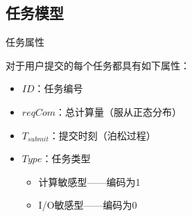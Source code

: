 \subsection{任务模型}

\begin{frame}{任务属性}

    \begin{center}
        \begin{minipage}{0.6\textwidth}

            对于用户提交的每个任务都具有如下属性：

            \begin{itemize}
                \item $ID$：任务编号
                \item $reqCom$：总计算量（服从正态分布）
                \item $T_{submit}$：提交时刻（泊松过程）
                \item $Type$：任务类型
                      \begin{itemize}
                          \item 计算敏感型——编码为1
                          \item I/O敏感型——编码为0
                      \end{itemize}
            \end{itemize}

        \end{minipage}
    \end{center}

\end{frame}

